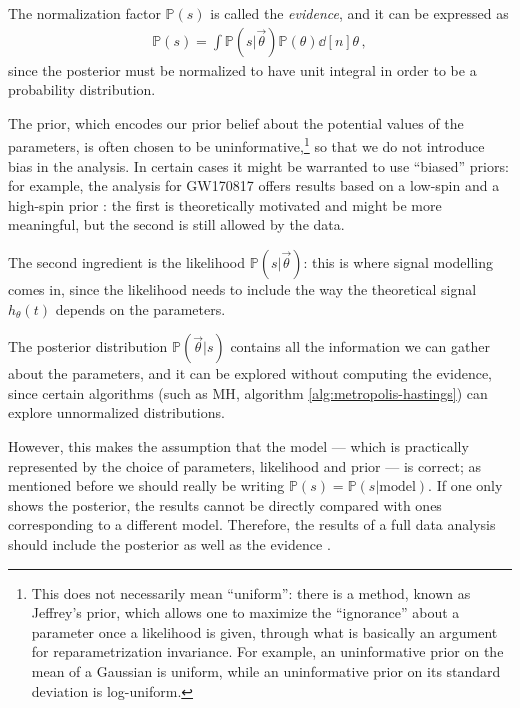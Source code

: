 \documentclass[main.tex]{subfiles}
\begin{document}
The normalization factor \(\mathbb{P}(s)\) is called the \emph{evidence}, and it can be expressed as 
%
\begin{align}
\mathbb{P} (s) = \int \mathbb{P}(s | \vec{\theta}) \mathbb{P}(\theta ) \dd[n]{\theta }
\,,
\end{align}
%
since the posterior must be normalized to have unit integral in order to be a probability distribution. 


The prior, which encodes our prior belief about the potential values of the parameters, is often chosen to be uninformative,\footnote{This does not necessarily mean ``uniform'': there is a method, known as Jeffrey's prior, which allows one to maximize the ``ignorance'' about a parameter once a likelihood is given, through what is basically an argument for reparametrization invariance. For example, an uninformative prior on the mean of a Gaussian is uniform, while an uninformative prior on its standard deviation is log-uniform.} so that we do not introduce bias in the analysis. 
In certain cases it might be warranted to use ``biased'' priors: for example, the analysis for GW170817 offers results based on a low-spin and a high-spin prior \cite{abbottGW170817ObservationGravitational2017}: the first is theoretically motivated and might be more meaningful, but the second is still allowed by the data. 

The second ingredient is the likelihood \(\mathbb{P}(s | \vec{\theta})\): this is where signal modelling comes in, since the likelihood needs to include the way the theoretical signal \(h_\theta (t)\) depends on the parameters. 

The posterior distribution \(\mathbb{P}(\vec{\theta} | s)\) contains all the information we can gather about the parameters, and it can be explored without computing the evidence, since certain algorithms (such as \ac{MH}, algorithm \ref{alg:metropolis-hastings}) can explore unnormalized distributions. 

However, this makes the assumption that the model --- which is practically represented by the choice of parameters, likelihood and prior --- is correct; as mentioned before we should really be writing \( \mathbb{P}(s) = \mathbb{P}(s | \text{model})\). 
If one only shows the posterior, the results cannot be directly compared with ones corresponding to a different model. Therefore, the results of a full data analysis should include the posterior as well as the evidence \cites{skillingNestedSamplingGeneral2006}{knuthBayesianEvidenceModel2015}.
\end{document}
